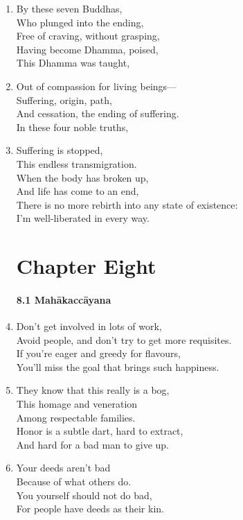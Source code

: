\documentclass[10pt, openany]{book}
\begin{document}
\begin{enumerate}
\item By these seven Buddhas, \\
Who plunged into the ending,\\
Free of craving, without grasping,\\
Having become Dhamma, poised,\\
This Dhamma was taught,

\item Out of compassion for living beings—\\
Suffering, origin, path,\\
And cessation, the ending of suffering.\\
In these four noble truths,

\item Suffering is stopped,\\
This endless transmigration.\\
When the body has broken up,\\
And life has come to an end,\\
There is no more rebirth into any state of existence:\\
I’m well-liberated in every way.

\chapter*{Chapter Eight}

\subsubsection*{8.1 Mahākaccāyana}

\item Don’t get involved in lots of work,\\
Avoid people, and don’t try to get more requisites.\\
If you’re eager and greedy for flavours,\\
You’ll miss the goal that brings such happiness.

\item They know that this really is a bog,\\
This homage and veneration \\
Among respectable families.\\
Honor is a subtle dart, hard to extract,\\
And hard for a bad man to give up.

\item Your deeds aren’t bad\\
Because of what others do.\\
You yourself should not do bad,\\
For people have deeds as their kin.


\end{enumerate}
\end{document}
